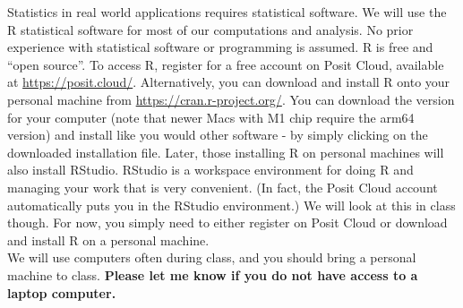 Statistics in real world applications requires statistical software. We will use the R statistical software for most of our computations and analysis. No prior experience with statistical software or programming is assumed. R is free and ``open source''. To access R, register for a free account on Posit Cloud, available at \url{https://posit.cloud/}. Alternatively, you can download and install R onto your personal machine from \url{https://cran.r-project.org/}. You can download the version for your computer (note that newer Macs with M1 chip require the arm64 version) and install like you would other software - by simply clicking on the downloaded installation file. Later, those installing R on personal machines will also install RStudio. RStudio is a workspace environment for doing R and managing your work that is very convenient. (In fact, the Posit Cloud account automatically puts you in the RStudio environment.) We will look at this in class though. For now, you simply need to either register on Posit Cloud or download and install R on a personal machine.\\

We will use computers often during class, and you should bring a personal machine to class. {\bf Please let me know if you do not have access to a laptop computer.}






